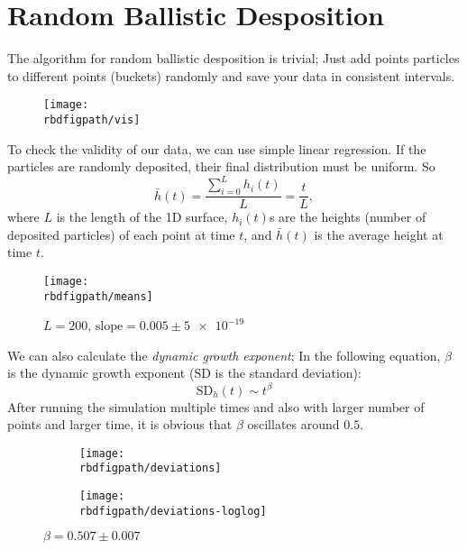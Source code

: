 \documentclass[12pt,a4paper]{article}
\newcommand{\rbdfigpath}{../fig/random-ballistic-deposition}
\begin{document}
    \section{Random Ballistic Desposition}
    The algorithm for random ballistic desposition is trivial; Just add points particles to different points (buckets)
    randomly and save your data in consistent intervals.
    
    \begin{figure}[htb!]
        \centering
        \texttt{[image: \\rbdfigpath/vis]}
    \end{figure}

    To check the validity of our data, we can use simple linear regression. If the particles are randomly deposited,
    their final distribution must be uniform. So
    \begin{equation}
        \bar{h}(t) = \frac{\sum_{i=0}^{L}h_i(t)}{L} = \frac{t}{L},
    \end{equation}
    where $L$ is the length of the 1D surface, $h_i(t)$s are the heights (number of deposited particles) of each point
    at time $t$, and $\bar{h}(t)$ is the average height at time $t$.

    \begin{figure}[htb!]
        \centering
        \texttt{[image: \\rbdfigpath/means]}
        \caption{$L = 200$, $\text{slope} = 0.005 \pm \num{5e-19}$}
    \end{figure}

    We can also calculate the \emph{dynamic growth exponent}; In the following equation, $\beta$ is the
    dynamic growth exponent ($\mathrm{SD}$ is the standard deviation):
    \begin{equation}
        \mathrm{SD}_h(t) \sim t^\beta
    \end{equation}
    After running the simulation multiple times and also with larger number of points and larger time,
    it is obvious that $\beta$ oscillates around $0.5$.

    \begin{figure}[htb!]
        \centering
        \begin{subfigure}{\linewidth}
            \centering
            \texttt{[image: \\rbdfigpath/deviations]}
        \end{subfigure}
        \begin{subfigure}{\linewidth}
            \centering
            \texttt{[image: \\rbdfigpath/deviations-loglog]}
        \end{subfigure}
        \caption{$\beta=0.507 \pm 0.007$}
    \end{figure}
\end{document}
